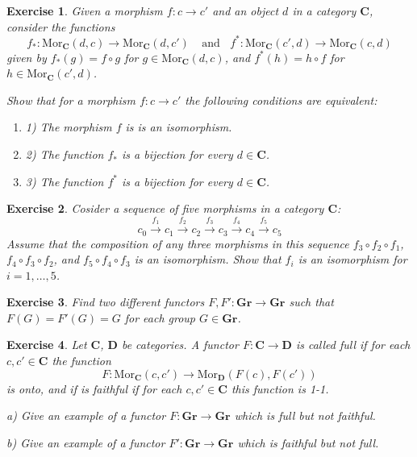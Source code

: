 \documentclass[11pt, letterpaper, oneside]{report}
\theoremstyle{pplain}
\theoremstyle{ddefinition}
\theoremstyle{nnn}
\theoremstyle{eexercise}
\newtheorem{exercise}{Exercise}[chapter]
\newcommand{\Mor}{\mathrm{Mor}}
\newcommand{\CC}{{\mathbf C}}
\newcommand{\DD}{{\mathbf D}}
\newcommand{\Gr}{{\mathbf{Gr}}}
\newcommand{\benu}{\begin{enumerate}}
\newcommand{\eenu}{\end{enumerate}}
\begin{document}
\begin{exercise}
Given  a morphism  $f\colon c \to c'$ and an object $d$ in a category $\CC$, consider the functions 
$$f_{\ast}\colon \Mor_{\CC}(d, c) \to \Mor_{\CC}(d, c') \ \ \ \ \ \text{and}  \ \ \ \ 
f^{\ast}\colon \Mor_{\CC}(c', d) \to \Mor_{\CC}(c, d)$$
given by $f_{\ast}(g) = f\circ g$  for $g \in  \Mor_{\CC}(d, c)$, 
and $f^{\ast}(h) = h\circ f$ for $h \in  \Mor_{\CC}(c', d)$. 

Show that  for a  morphism $f\colon c \to c'$  the following conditions are equivalent:
\benu
\item[1)] The morphism $f$ is is an isomorphism.
\item[2)] The function $f_{\ast}$ is a bijection for every $d\in \CC$.
\item[3)] The function $f^{\ast}$ is a bijection for every $d\in \CC$. 
\eenu
\end{exercise}


\begin{exercise}
Cosider a sequence of five morphisms in a category $\CC$:
$$
c_{0} \xrightarrow{f_{1}} 
c_{1} \xrightarrow{f_{2}} 
c_{2} \xrightarrow{f_{3}} 
c_{3} \xrightarrow{f_{4}} 
c_{4} \xrightarrow{f_{5}} 
c_{5}
$$
Assume that the composition of any three morphisms in this sequence $f_{3}\circ f_{2}\circ f_{1}$, 
$f_{4}\circ f_{3}\circ f_{2}$, and $f_{5}\circ f_{4}\circ f_{3}$ is an isomorphism. Show that 
$f_{i}$ is an isomorphism for $i=1,\dots, 5$.
\end{exercise}

\begin{exercise}
Find two different functors $F, F' \colon \Gr \to \Gr$ such that $F(G) = F'(G) = G$ for each group 
$G\in \Gr$.  
\end{exercise}





\begin{exercise}
\label{FULL FAITHFUL EXERCISE}
Let $\CC$, $\DD$ be categories. A functor $F\colon \CC \to \DD$ is called \emph{full} if for each 
$c, c'\in \CC$ the function 
$$F\colon \Mor_{\CC}(c, c') \to \Mor_{\DD}(F(c), F(c'))$$
is onto, and if is \emph{faithful} if for each $c, c'\in \CC$ this function is 1-1. 

a) Give an example of a functor $F\colon \Gr \to \Gr$ which is full but not faithful. 

b) Give an example of a functor $F'\colon \Gr \to \Gr$ which is faithful but not full. 

\end{exercise}
\end{document}
